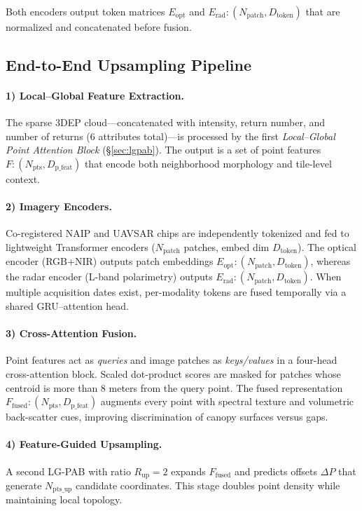 \documentclass[remotesensing,article,submit,pdftex,moreauthors]{Definitions/mdpi}
\begin{document}
Both encoders output token matrices $E_{\text{opt}}$ and $E_{\text{rad}}: (N_{\text{patch}}, D_{\text{token}})$ that are normalized and concatenated before fusion.



\subsection{End-to-End Upsampling Pipeline}
\label{sec:pipeline}

\paragraph{1) Local–Global Feature Extraction.}
The sparse 3DEP cloud—concatenated with intensity, return number, and number of returns (6 attributes total)—is processed by the first \emph{Local–Global Point Attention Block} (§\ref{sec:lgpab}). The output is a set of point features $F: (N_{\text{pts}}, D_{\text{p\_feat}})$ that encode both neighborhood morphology and tile-level context.

\paragraph{2) Imagery Encoders.}
Co-registered NAIP and UAVSAR chips are independently tokenized and fed to lightweight Transformer encoders ($N_{\text{patch}}$ patches, embed dim $D_{\text{token}}$).
The optical encoder (RGB+NIR) outputs patch embeddings $E_{\text{opt}}: (N_{\text{patch}}, D_{\text{token}})$, whereas the radar encoder (L-band polarimetry) outputs $E_{\text{rad}}: (N_{\text{patch}}, D_{\text{token}})$.
When multiple acquisition dates exist, per-modality tokens are fused temporally via a shared GRU–attention head.

\paragraph{3) Cross-Attention Fusion.}
Point features act as \emph{queries} and image patches as \emph{keys/values} in a four-head cross-attention block.
Scaled dot-product scores are masked for patches whose centroid is more than 8 meters from the query point.
The fused representation $F_{\text{fused}}: (N_{\text{pts}}, D_{\text{p\_feat}})$ augments every point with spectral texture and volumetric back-scatter cues, improving discrimination of canopy surfaces versus gaps.

\paragraph{4) Feature-Guided Upsampling.}
A second LG-PAB with ratio $R_{\text{up}}=2$ expands $F_{\text{fused}}$ and predicts offsets $\Delta P$ that generate $N_{\text{pts\_up}}$ candidate coordinates. This stage doubles point density while maintaining local topology.
\end{document}
